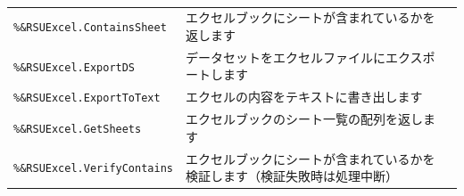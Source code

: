 \paragraph{\DocStrTitleRDMPackageFunctionList}
\begin{center}
{\footnotesize
\begin{xltabular}{\textwidth}{|p{4truecm}|X|p{1.2truecm}|}
\hline
\thead{\DocStrHeaderFunctionName}&\thead{\DocStrDescription}&\thead{\DocStrRefto}\\
\hline
\hline
\texttt{\%\&RSUExcel.ContainsSheet}&エクセルブックにシートが含まれているかを返します&\\
\hline
\texttt{\%\&RSUExcel.ExportDS}&データセットをエクセルファイルにエクスポートします&\\
\hline
\texttt{\%\&RSUExcel.ExportToText}&エクセルの内容をテキストに書き出します&\\
\hline
\texttt{\%\&RSUExcel.GetSheets}&エクセルブックのシート一覧の配列を返します&\\
\hline
\texttt{\%\&RSUExcel.VerifyContains}&エクセルブックにシートが含まれているかを検証します（検証失敗時は処理中断）&\\
\hline
\end{xltabular}
}
\end{center}
